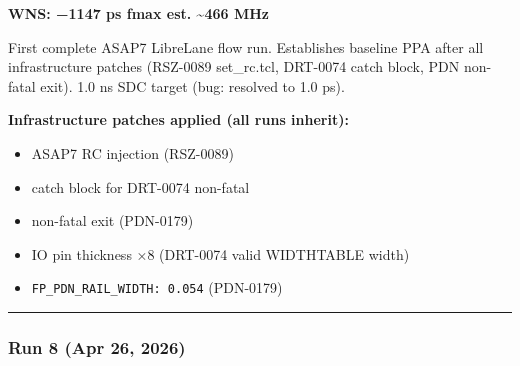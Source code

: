 \begin{record}

\textbf{WNS: −1147 ps \textbar{} fmax est. \textasciitilde466 MHz}

First complete ASAP7 LibreLane flow run. Establishes baseline PPA after
all infrastructure patches (RSZ-0089 set\_\allowbreak{}rc.tcl, DRT-0074
catch block, PDN non-fatal exit). 1.0 ns SDC target (bug: resolved to
1.0 ps).

\textbf{Infrastructure patches applied (all runs inherit):}

\begin{itemize}
\tightlist
\item
   ASAP7 RC injection (RSZ-0089)
\item
   catch block for DRT-0074 non-fatal
\item
   non-fatal exit (PDN-0179)
\item
  IO pin thickness ×8 (DRT-0074 valid WIDTHTABLE width)
\item
  \texttt{FP\_\allowbreak{}PDN\_\allowbreak{}RAIL\_\allowbreak{}WIDTH:\allowbreak{}\ 0.\allowbreak{}054}
  (PDN-0179)
\end{itemize}

\begin{center}\rule{0.5\linewidth}{0.5pt}\end{center}

\end{record}

\subsubsection{Run 8 (Apr 26, 2026)}\label{cr:run:asap7:run-8-apr-26-2026}

